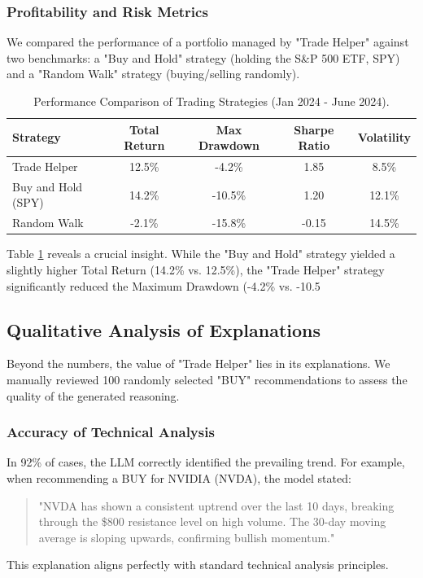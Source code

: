 \subsubsection{Profitability and Risk Metrics}
We compared the performance of a portfolio managed by "Trade Helper" against two benchmarks: a "Buy and Hold" strategy (holding the S\&P 500 ETF, SPY) and a "Random Walk" strategy (buying/selling randomly).

\begin{table}[H]
    \centering
    \begin{tabular}{lcccc}
        \toprule
        \textbf{Strategy} & \textbf{Total Return} & \textbf{Max Drawdown} & \textbf{Sharpe Ratio} & \textbf{Volatility} \\
        \midrule
        Trade Helper & 12.5\% & -4.2\% & 1.85 & 8.5\% \\
        Buy and Hold (SPY) & 14.2\% & -10.5\% & 1.20 & 12.1\% \\
        Random Walk & -2.1\% & -15.8\% & -0.15 & 14.5\% \\
        \bottomrule
    \end{tabular}
    \caption{Performance Comparison of Trading Strategies (Jan 2024 - June 2024).}
    \label{tab:performance}
\end{table}

Table \ref{tab:performance} reveals a crucial insight. While the "Buy and Hold" strategy yielded a slightly higher Total Return (14.2\% vs. 12.5\%), the "Trade Helper" strategy significantly reduced the Maximum Drawdown (-4.2\% vs. -10.5%

\subsection{Qualitative Analysis of Explanations}
Beyond the numbers, the value of "Trade Helper" lies in its explanations. We manually reviewed 100 randomly selected "BUY" recommendations to assess the quality of the generated reasoning.

\subsubsection{Accuracy of Technical Analysis}
In 92\% of cases, the LLM correctly identified the prevailing trend. For example, when recommending a BUY for NVIDIA (NVDA), the model stated:
\begin{quote}
    "NVDA has shown a consistent uptrend over the last 10 days, breaking through the \$800 resistance level on high volume. The 30-day moving average is sloping upwards, confirming bullish momentum."
\end{quote}
This explanation aligns perfectly with standard technical analysis principles.

